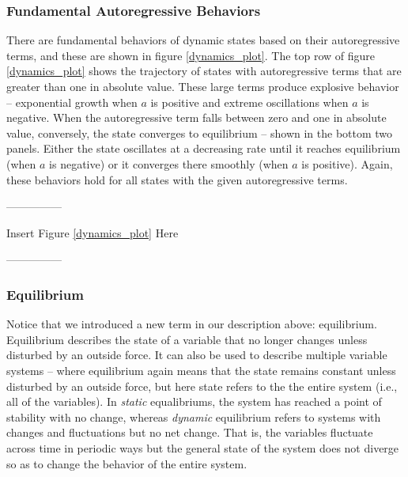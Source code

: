 \documentclass[english,,man]{apa6}
\theoremstyle{definition}
\theoremstyle{definition}
\theoremstyle{definition}
\theoremstyle{remark}
\begin{document}
\hypertarget{fundamental-autoregressive-behaviors}{%
\subsubsection{Fundamental Autoregressive
Behaviors}\label{fundamental-autoregressive-behaviors}}

There are fundamental behaviors of dynamic states based on their
autoregressive terms, and these are shown in figure \ref{dynamics_plot}.
The top row of figure \ref{dynamics_plot} shows the trajectory of states
with autoregressive terms that are greater than one in absolute value.
These large terms produce explosive behavior -- exponential growth when
\(a\) is positive and extreme oscillations when \(a\) is negative. When
the autoregressive term falls between zero and one in absolute value,
conversely, the state converges to equilibrium -- shown in the bottom
two panels. Either the state oscillates at a decreasing rate until it
reaches equilibrium (when \(a\) is negative) or it converges there
smoothly (when \(a\) is positive). Again, these behaviors hold for all
states with the given autoregressive terms.

\begin{center}

---------------

Insert Figure \ref{dynamics_plot} Here

---------------

\end{center}

\hypertarget{equilibrium}{%
\subsubsection{Equilibrium}\label{equilibrium}}

Notice that we introduced a new term in our description above:
equilibrium. Equilibrium describes the state of a variable that no
longer changes unless disturbed by an outside force. It can also be used
to describe multiple variable systems -- where equilibrium again means
that the state remains constant unless disturbed by an outside force,
but here state refers to the the entire system (i.e., all of the
variables). In \emph{static} equalibriums, the system has reached a
point of stability with no change, whereas \emph{dynamic} equilibrium
refers to systems with changes and fluctuations but no net change. That
is, the variables fluctuate across time in periodic ways but the general
state of the system does not diverge so as to change the behavior of the
entire system.
\end{document}
